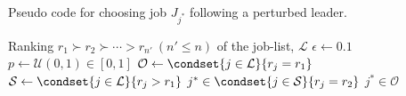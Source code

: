 \begin{algorithm}
    \caption[Perturbed leader]{Pseudo code for choosing job 
    $J_{j^*}$ following a perturbed leader.}
    \label{pseudo:perturbedLeader}
    \begin{algorithmic}[1]
        \Require Ranking $r_1 \succ r_2 \succ \cdots > r_{n'} ~ (n' \leq n)$ of 
        the job-list, $\mathcal{L}$ 
        \State $\epsilon \gets 0.1$ 
        \State $p \gets \mathcal{U}(0,1)\in [0,1]$
        \State $\mathcal{O} \gets \condset{j\in\mathcal{L}}{r_j=r_1}$ 
        \State $\mathcal{S} \gets \condset{j\in\mathcal{L}}{r_j>r_1}$
        \State \Return $j^* \in \condset{j\in\mathcal{S}}{r_j=r_2}$ 
        \Else 
        \State \Return $j^* \in\mathcal{O}$ 
        \EndIf
        \EndProcedure
    \end{algorithmic}
\end{algorithm}